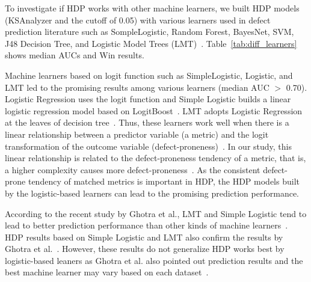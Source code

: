 To investigate if
HDP works with other machine learners, we built HDP models (KSAnalyzer and
the cutoff of 0.05) with various learners used in defect prediction
literature such as SompleLogistic, Random Forest, BayesNet, SVM, J48 Decision
Tree, and Logistic Model Trees
(LMT)~\cite{DAmbros12,Ghotra15,Lee11,Lessmann08,Nam13,Song11,Ghotra15}.
Table~\ref{tab:diff_learners} shows median AUCs and Win results.

Machine learners based on logit function such as SimpleLogistic, Logistic, and LMT led to the promising results among various learners (median AUC $>$ 0.70).
Logistic Regression uses the logit function and Simple Logistic builds a linear logistic regression model based on LogitBoost~\cite{Landwehr2005}.
LMT adopts Logistic Regression at the leaves of decision tree~\cite{Ghotra15}.
Thus, these learners work well when there is a linear
relationship between a predictor variable (a metric) and the logit
transformation of the outcome variable (defect-proneness)~\cite{Landwehr2005,Logstic}.
In our study, this linear relationship is related to the defect-proneness tendency of
a metric, that is, a higher complexity causes more defect-proneness~\cite{DAmbros12,Menzies07,Rahman13}.
As the consistent defect-prone tendency of matched metrics is important in HDP, the
HDP models built by  the logistic-based learners can lead to the promising prediction
performance.


According to the recent study by Ghotra et al., LMT and Simple Logistic tend to lead to better prediction performance than other kinds of machine learners~\cite{Ghotra15}. HDP results based on Simple Logistic and LMT also confirm the results by Ghotra et al.~\cite{Ghotra15}. However, these results do not generalize HDP works best by logistic-based leaners as Ghotra et al. also pointed out prediction results and the best machine learner may vary based on each dataset~\cite{Ghotra15}.

